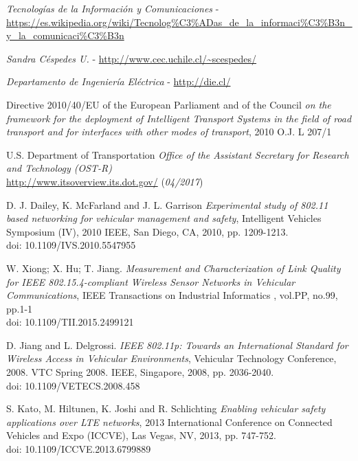\documentclass[11pt,letterpaper]{article}
\begin{document}
\newpage
\begin{thebibliography}{5}
     \emph{Tecnologías de la Información y Comunicaciones} - \url{https://es.wikipedia.org/wiki/Tecnolog%C3%ADas_de_la_informaci%C3%B3n_y_la_comunicaci%C3%B3n}

     \emph{Sandra Céspedes U.} - \url{http://www.cec.uchile.cl/~scespedes/}

     \emph{Departamento de Ingeniería Eléctrica} - \url{http://die.cl/}

  		 Directive 2010/40/EU of the European Parliament and of the Council
  		\textit{on the framework for the deployment of Intelligent Transport Systems in the field of road transport and for interfaces with other modes of transport},
  		2010 O.J. L 207/1

  		 U.S. Department of Transportation
  		\textit{Office of the Assistant Secretary for Research and Technology (OST-R)}
  		\\\url{http://www.itsoverview.its.dot.gov/} (\textit{04/2017})

  		 D. J. Dailey, K. McFarland and J. L. Garrison
  		\textit{Experimental study of 802.11 based networking for vehicular management and safety},
  		Intelligent Vehicles Symposium (IV), 2010 IEEE, San Diego, CA, 2010, pp. 1209-1213.
  		\\doi: 10.1109/IVS.2010.5547955


  		 W. Xiong; X. Hu; T. Jiang.
  		\textit{Measurement and Characterization of Link Quality for IEEE 802.15.4-compliant Wireless Sensor Networks in Vehicular Communications},
  		IEEE Transactions on Industrial Informatics , vol.PP, no.99, pp.1-1
  		\\doi: 10.1109/TII.2015.2499121

  		 D. Jiang and L. Delgrossi.
  		\textit{IEEE 802.11p: Towards an International Standard for Wireless Access in Vehicular Environments}, Vehicular Technology Conference, 2008. VTC Spring 2008. IEEE, Singapore, 2008, pp. 2036-2040.
  		\\doi: 10.1109/VETECS.2008.458

		 S. Kato, M. Hiltunen, K. Joshi and R. Schlichting
		\textit{Enabling vehicular safety applications over LTE networks},
		2013 International Conference on Connected Vehicles and Expo (ICCVE), Las Vegas, NV, 2013, pp. 747-752.
		\\doi: 10.1109/ICCVE.2013.6799889


\end{thebibliography}
\end{document}
